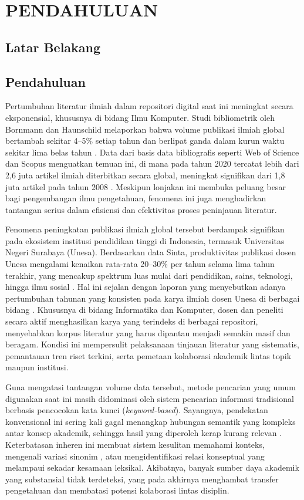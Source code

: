\chapter{PENDAHULUAN}

\section{Latar Belakang}

\section{Pendahuluan}

Pertumbuhan literatur ilmiah dalam repositori digital saat ini meningkat secara eksponensial, khususnya di bidang Ilmu Komputer. Studi bibliometrik oleh Bornmann dan Haunschild melaporkan bahwa volume publikasi ilmiah global bertambah sekitar 4--5\% setiap tahun dan berlipat ganda dalam kurun waktu sekitar lima belas tahun \cite{bornmann2021growthratesmodernscience}. Data dari basis data bibliografis seperti Web of Science dan Scopus menguatkan temuan ini, di mana pada tahun 2020 tercatat lebih dari 2,6 juta artikel ilmiah diterbitkan secara global, meningkat signifikan dari 1,8 juta artikel pada tahun 2008 \cite{nsb2020publications}. Meskipun lonjakan ini membuka peluang besar bagi pengembangan ilmu pengetahuan, fenomena ini juga menghadirkan tantangan serius dalam efisiensi dan efektivitas proses peninjauan literatur.

Fenomena peningkatan publikasi ilmiah global tersebut berdampak signifikan pada ekosistem institusi pendidikan tinggi di Indonesia, termasuk Universitas Negeri Surabaya (Unesa). Berdasarkan data Sinta, produktivitas publikasi dosen Unesa mengalami kenaikan rata-rata 20--30\% per tahun selama lima tahun terakhir, yang mencakup spektrum luas mulai dari pendidikan, sains, teknologi, hingga ilmu sosial \cite{sinta_unesa2024}. Hal ini sejalan dengan laporan yang menyebutkan adanya pertumbuhan tahunan yang konsisten pada karya ilmiah dosen Unesa di berbagai bidang \cite{IKASARI2024101100}. Khususnya di bidang Informatika dan Komputer, dosen dan peneliti secara aktif menghasilkan karya yang terindeks di berbagai repositori, menyebabkan korpus literatur yang harus dipantau menjadi semakin masif dan beragam. Kondisi ini mempersulit pelaksanaan tinjauan literatur yang sistematis, pemantauan tren riset terkini, serta pemetaan kolaborasi akademik lintas topik maupun institusi.

Guna mengatasi tantangan volume data tersebut, metode pencarian yang umum digunakan saat ini masih didominasi oleh sistem pencarian informasi tradisional berbasis pencocokan kata kunci (\textit{keyword-based}). Sayangnya, pendekatan konvensional ini sering kali gagal menangkap hubungan semantik yang kompleks antar konsep akademik, sehingga hasil yang diperoleh kerap kurang relevan \cite{introretrieval}. Keterbatasan inheren ini membuat sistem kesulitan memahami konteks, mengenali variasi sinonim \cite{indexingbylatent}, atau mengidentifikasi relasi konseptual yang melampaui sekadar kesamaan leksikal. Akibatnya, banyak sumber daya akademik yang substansial tidak terdeteksi, yang pada akhirnya menghambat transfer pengetahuan dan membatasi potensi kolaborasi lintas disiplin.

